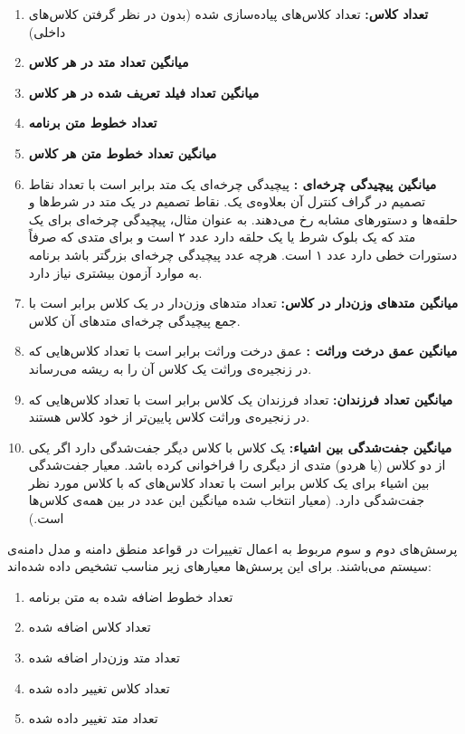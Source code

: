 \begin{enumerate}
\item\textbf{تعداد کلاس:}
 تعداد کلاس‌های پیاده‌سازی شده (بدون در نظر گرفتن کلاس‌های داخلی)
\item\textbf{میانگین تعداد متد در هر کلاس}

\item\textbf{میانگین تعداد فیلد تعریف شده در هر کلاس}

\item\textbf{تعداد خطوط متن برنامه}

\item\textbf{میانگین تعداد خطوط متن هر کلاس}

\item\textbf{میانگین پیچیدگی چرخه‌ای :}
پیچیدگی چرخه‌ای یک متد برابر است با تعداد نقاط تصمیم در گراف کنترل آن بعلاوه‌ی یک. نقاط تصمیم در یک متد در شرط‌ها و حلقه‌ها و دستورهای مشابه رخ می‌دهند. به عنوان مثال، پیچیدگی چرخه‌ای برای یک متد که یک بلوک شرط  یا یک حلقه دارد عدد ۲ است و برای متدی که صرفاً دستورات خطی دارد عدد ۱ است. هرچه عدد پیچیدگی چرخه‌ای بزرگتر باشد برنامه به موارد آزمون بیشتری نیاز دارد.
\item\textbf{میانگین متدهای وزن‌دار در کلاس:}
تعداد متدهای وزن‌دار در یک کلاس برابر است با جمع پیچیدگی چرخه‌ای متدهای آن کلاس.
\item\textbf{میانگین عمق درخت وراثت :}
عمق درخت وراثت برابر است با تعداد کلاس‌هایی که در زنجیره‌ی وراثت یک کلاس آن را به ریشه می‌رساند.

\item\textbf{میانگین تعداد فرزندان:}
تعداد فرزندان یک کلاس برابر است با تعداد کلاس‌هایی که در زنجیره‌ی وراثت کلاس پایین‌تر از خود کلاس هستند.
\item\textbf{میانگین \gls{جفت‌شدگی} بین اشیاء:}
یک کلاس با کلاس دیگر جفت‌شدگی دارد اگر یکی از دو کلاس (یا هردو) متدی از دیگری را فراخوانی کرده باشد. معیار جفت‌شدگی بین اشیاء برای یک کلاس برابر است با تعداد کلاس‌های که با کلاس مورد نظر جفت‌شدگی دارد. (معیار انتخاب شده میانگین این عدد در بین همه‌ی کلاس‌ها است.)
\end{enumerate}
پرسش‌های دوم و سوم مربوط به اعمال تغییرات در قواعد منطق دامنه و مدل دامنه‌ی سیستم می‌باشند. برای این پرسش‌ها معیارهای زیر مناسب تشخیص داده شده‌اند:
\begin{enumerate}
\item تعداد خطوط اضافه شده به متن برنامه
\item تعداد کلاس اضافه شده
\item تعداد متد وزن‌دار اضافه شده
\item تعداد کلاس تغییر داده شده
\item تعداد متد تغییر داده شده
\end{enumerate}
